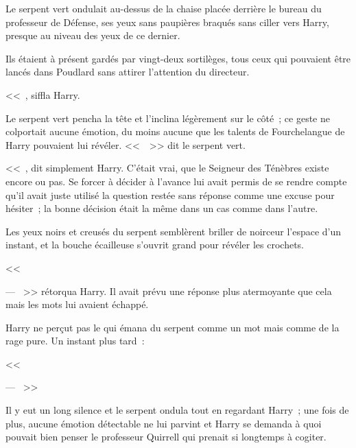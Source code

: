 Le serpent vert ondulait au-dessus de la chaise placée derrière le bureau du professeur de Défense, ses yeux sans paupières braqués sans ciller vers Harry, presque au niveau des yeux de ce dernier.

Ils étaient à présent gardés par vingt-deux sortilèges, tous ceux qui pouvaient être lancés dans Poudlard sans attirer l'attention du directeur.

<<~, siffla Harry.

Le serpent vert pencha la tête et l'inclina légèrement sur le côté~; ce geste ne colportait aucune émotion, du moins aucune que les talents de Fourchelangue de Harry pouvaient lui révéler. <<~~>> dit le serpent vert.

<<~, dit simplement Harry. C'était vrai, que le Seigneur des Ténèbres existe encore ou pas. Se forcer à décider à l'avance lui avait permis de se rendre compte qu'il avait juste utilisé la question restée sans réponse comme une excuse pour hésiter~; la bonne décision était la même dans un cas comme dans l'autre.

Les yeux noirs et creusés du serpent semblèrent briller de noirceur l'espace d'un instant, et la bouche écailleuse s'ouvrit grand pour révéler les crochets.

<<~

--- ~>> rétorqua Harry. Il avait prévu une réponse plus atermoyante que cela mais les mots lui avaient échappé.

Harry ne perçut pas le  qui émana du serpent comme un mot mais comme de la rage pure. Un instant plus tard~:

<<~

--- ~>>

Il y eut un long silence et le serpent ondula tout en regardant Harry~; une fois de plus, aucune émotion détectable ne lui parvint et Harry se demanda à quoi pouvait bien penser le professeur Quirrell qui prenait si longtemps à cogiter.

